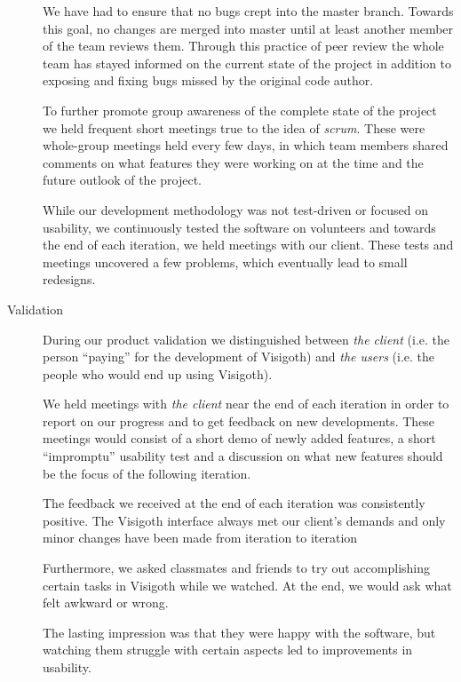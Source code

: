 \documentclass[a4paper,11pt,titlepage]{article}
\begin{document}
\begin{description}
    We have had to ensure that no bugs crept into the master branch. Towards
    this goal, no changes are merged into master until at least another member
    of the team reviews them. Through this practice of peer review the whole
    team has stayed informed on the current state of the project in addition to
    exposing and fixing bugs missed by the original code author.

    To further promote group awareness of the complete state of the project we
    held frequent short meetings true to the idea of \emph{scrum}. These were
    whole-group meetings held every few days, in which team members shared
    comments on what features they were working on at the time and the future
    outlook of the project.

    While our development methodology was not test-driven or focused on
    usability, we continuously tested the software on volunteers and towards the
    end of each iteration, we held meetings with our client. These tests and
    meetings uncovered a few problems, which eventually lead to small redesigns.

	\item[Validation]

	During our product validation we distinguished between \emph{the client} (i.e.
	the person ``paying'' for the development of Visigoth) and \emph{the users}
	(i.e. the people who would end up using Visigoth).

	We held meetings with \emph{the client} near the end of each iteration
	in order to report on our progress and to get feedback on new
	developments. These meetings would consist of a short demo of newly
	added features, a short ``impromptu'' usability test and a discussion
	on what new features should be the focus of the following iteration.

	The feedback we received at the end of each iteration was consistently
	positive. The Visigoth interface always met our client's demands and
	only minor changes have been made from iteration to iteration

	Furthermore, we asked classmates and friends to try
	out accomplishing certain tasks in Visigoth while we watched. At the
	end, we would ask what felt awkward or wrong.

	The lasting impression was that they were happy with the software, but
	watching them struggle with certain aspects led to improvements in
	usability.


\end{description}
\end{document}
